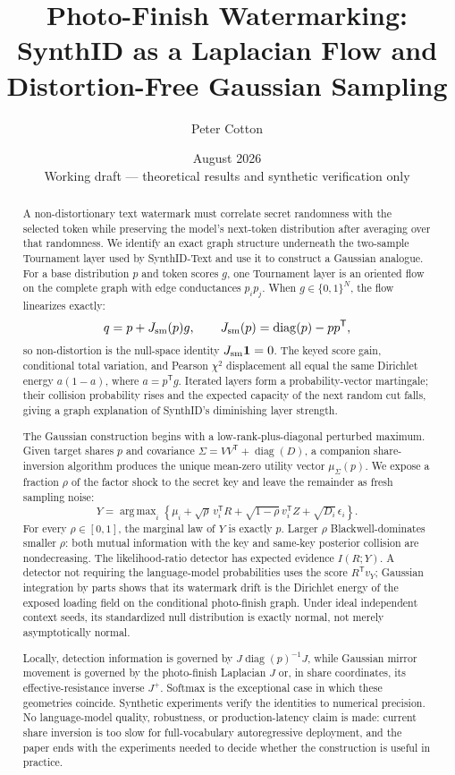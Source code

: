 \documentclass[11pt]{article}
\title{\textbf{Photo-Finish Watermarking:}\\
SynthID as a Laplacian Flow and Distortion-Free Gaussian Sampling}
\author{Peter Cotton}
\date{August 2026\\[0.3em]\small Working draft --- theoretical results and synthetic verification only}
\theoremstyle{definition}
\theoremstyle{remark}
\DeclareMathOperator{\diag}{diag}
\DeclareMathOperator*{\argmax}{arg\,max}
\newcommand{\one}{\mathbf{1}}
\newcommand{\trans}{\mathsf{T}}
\begin{document}
\maketitle

\begin{abstract}
A non-distortionary text watermark must correlate secret randomness with the selected token while preserving the model's next-token distribution after averaging over that randomness. We identify an exact graph structure underneath the two-sample Tournament layer used by SynthID-Text and use it to construct a Gaussian analogue. For a base distribution $p$ and token scores $g$, one Tournament layer is an oriented flow on the complete graph with edge conductances $p_i p_j$. When $g\in\{0,1\}^N$, the flow linearizes exactly:
\[
q=p+J_{\rm sm}(p)g,
\qquad
J_{\rm sm}(p)=\diag(p)-pp^\trans,
\]
so non-distortion is the null-space identity $J_{\rm sm}\one=0$. The keyed score gain, conditional total variation, and Pearson $\chi^2$ displacement all equal the same Dirichlet energy $a(1-a)$, where $a=p^\trans g$. Iterated layers form a probability-vector martingale; their collision probability rises and the expected capacity of the next random cut falls, giving a graph explanation of SynthID's diminishing layer strength.

The Gaussian construction begins with a low-rank-plus-diagonal perturbed maximum. Given target shares $p$ and covariance $\Sigma=VV^\trans+\diag(D)$, a companion share-inversion algorithm produces the unique mean-zero utility vector $\mu_\Sigma(p)$. We expose a fraction $\rho$ of the factor shock to the secret key and leave the remainder as fresh sampling noise:
\[
Y=\argmax_i\left\{\mu_i+\sqrt{\rho}\,v_i^\trans R
       +\sqrt{1-\rho}\,v_i^\trans Z+\sqrt{D_i}\,\epsilon_i\right\}.
\]
For every $\rho\in[0,1]$, the marginal law of $Y$ is exactly $p$. Larger $\rho$ Blackwell-dominates smaller $\rho$: both mutual information with the key and same-key posterior collision are nondecreasing. The likelihood-ratio detector has expected evidence $I(R;Y)$. A detector not requiring the language-model probabilities uses the score $R^\trans v_Y$; Gaussian integration by parts shows that its watermark drift is the Dirichlet energy of the exposed loading field on the conditional photo-finish graph. Under ideal independent context seeds, its standardized null distribution is exactly normal, not merely asymptotically normal.

Locally, detection information is governed by $J\diag(p)^{-1}J$, while Gaussian mirror movement is governed by the photo-finish Laplacian $J$ or, in share coordinates, its effective-resistance inverse $J^+$. Softmax is the exceptional case in which these geometries coincide. Synthetic experiments verify the identities to numerical precision. No language-model quality, robustness, or production-latency claim is made: current share inversion is too slow for full-vocabulary autoregressive deployment, and the paper ends with the experiments needed to decide whether the construction is useful in practice.
\end{abstract}
\end{document}
